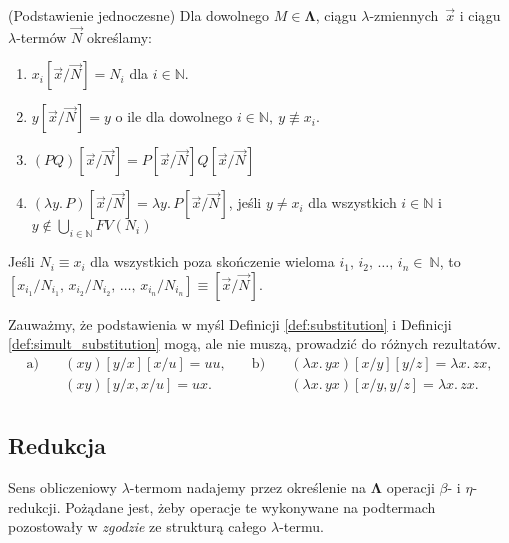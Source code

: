 \begin{definicja}(Podstawienie jednoczesne)\label{def:simult_substitution}
Dla dowolnego \(M\in\mathbf{\Lambda}\), ciągu \(\lambda\)-zmiennych~\(\vec{x}\) i ciągu \(\lambda\)-termów \(\vec{N}\) określamy:
  \begin{enumerate}[label={(\(\vec{s}\)\arabic*)}, ref={(\arabic*)}]
    \setlength\itemsep{0em}
    \item \(x_i[\vec{x}/\vec{N}]=N_i\) dla \(i\in\mathbb{N}\).
    \item \(y[\vec{x}/\vec{N}]=y\) o ile dla dowolnego \(i\in\mathbb{N},\ y\not\equiv x_i\).
    \item \((PQ)[\vec{x}/\vec{N}]=P[\vec{x}/\vec{N}]Q[\vec{x}/\vec{N}]\)
    \item \((\lambda y.\,P)[\vec{x}/\vec{N}]=\lambda y.\,P[\vec{x}/\vec{N}]\), jeśli \(y\neq x_i\) dla wszystkich \(i\in\mathbb{N}\) i \(y\not\in\bigcup_{i\in\mathbb{N}}FV(N_i)\)
 \end{enumerate}
\end{definicja}

\begin{konwencja*}
  Jeśli \(N_i\equiv x_i\) dla wszystkich poza skończenie wieloma \(i_1,\,i_2,\,\dots,\,i_n\in~\mathbb{N}\), to \([x_{i_1}/N_{i_1},\,x_{i_2}/N_{i_2},\,\dots,\,x_{i_n}/N_{i_n}]\equiv [\vec{x}/\vec{N}]\).
\end{konwencja*}

\begin{przyklad}
  Zauważmy, że podstawienia w myśl Definicji \ref{def:substitution} i Definicji \ref{def:simult_substitution} mogą, ale nie muszą, prowadzić do różnych rezultatów.
\begin{align*}
  \text{a)}\quad &  (xy)[y/x][x/u] = uu, &\quad\text{b)}\quad & (\lambda x.\,yx)[x/y][y/z]=\lambda x.\,zx, \\
                &  (xy)[y/x, x/u] = ux. & &(\lambda x.\,yx)[x/y,y/z]=\lambda x.\,zx.\\
\end{align*}

\end{przyklad}
\subsection{Redukcja}
Sens obliczeniowy \(\lambda\)-termom nadajemy przez określenie na \(\mathbf{\Lambda}\) operacji \(\beta\)- i \(\eta\)-redukcji. Pożądane jest, żeby operacje te wykonywane na podtermach pozostowały w \emph{zgodzie} ze strukturą całego \(\lambda\)-termu.

